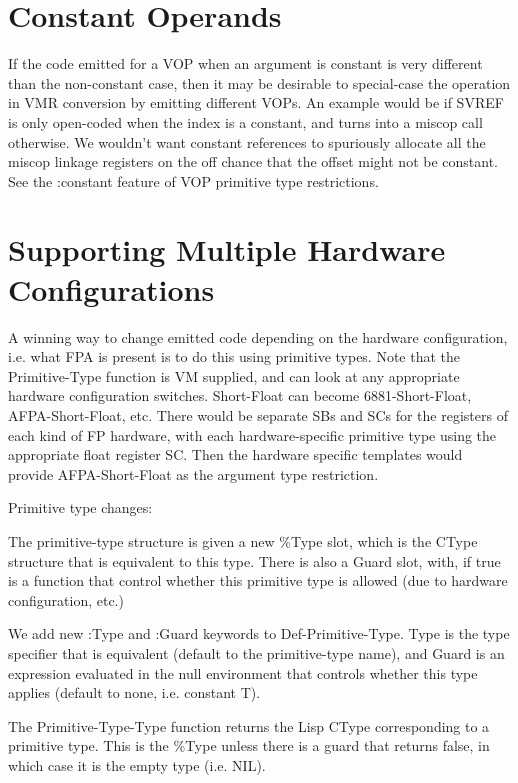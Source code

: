 
\section{Constant Operands}

If the code emitted for a VOP when an argument is constant is very different
than the non-constant case, then it may be desirable to special-case the
operation in VMR conversion by emitting different VOPs.  An example would be if
SVREF is only open-coded when the index is a constant, and turns into a miscop
call otherwise.  We wouldn't want constant references to spuriously allocate
all the miscop linkage registers on the off chance that the offset might not be
constant.  See the :constant feature of VOP primitive type restrictions.


\section{Supporting Multiple Hardware Configurations}


A winning way to change emitted code depending on the hardware configuration,
i.e. what FPA is present is to do this using primitive types.  Note that the
Primitive-Type function is VM supplied, and can look at any appropriate
hardware configuration switches.  Short-Float can become 6881-Short-Float,
AFPA-Short-Float, etc.  There would be separate SBs and SCs for the registers
of each kind of FP hardware, with each hardware-specific primitive type
using the appropriate float register SC.  Then the hardware specific templates
would provide AFPA-Short-Float as the argument type restriction.

Primitive type changes:

The primitive-type structure is given a new \%Type slot, which is the CType
structure that is equivalent to this type.  There is also a Guard slot, with,
if true is a function that control whether this primitive type is allowed (due
to hardware configuration, etc.)  

We add new :Type and :Guard keywords to Def-Primitive-Type.  Type is the type
specifier that is equivalent (default to the primitive-type name), and Guard is
an expression evaluated in the null environment that controls whether this type
applies (default to none, i.e. constant T).

The Primitive-Type-Type function returns the Lisp CType corresponding to a
primitive type.  This is the \%Type unless there is a guard that returns false,
in which case it is the empty type (i.e. NIL).

